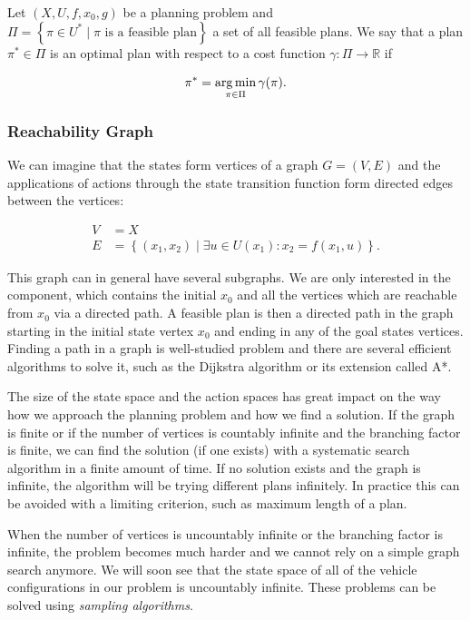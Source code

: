 \begin{defn}
	Let $\left(X, U, f, x_0, g\right)$ be a planning problem and $\Pi=\left\{\pi\in U^* \mid \pi \text{ is a feasible plan}\right\}$ a set of all feasible plans. We say that a plan $\pi^*\in \Pi$ is an optimal plan with respect to a cost function $\gamma: \Pi \rightarrow \mathbb{R}$ if
	
	\[
		\pi^*=\operatorname*{arg\,min}_{\pi\in\Pi} \gamma(\pi).
	\]
\end{defn}

\subsubsection{Reachability Graph}

We can imagine that the states form vertices of a graph $G=(V, E)$ and the applications of actions through the state transition function form directed edges between the vertices:

\begin{equation*}
\begin{aligned}
	V&=X \\
	E&=\left\{(x_1, x_2) \mid \exists u \in U(x_1): x_2 = f(x_1, u) \right\}.
\end{aligned}
\end{equation*}

This graph can in general have several subgraphs. We are only interested in the component, which contains the initial $x_0$ and all the vertices which are reachable from $x_0$ via a directed path. A feasible plan is then a directed path in the graph starting in the initial state vertex $x_0$ and ending in any of the goal states vertices. Finding a path in a graph is well-studied problem and there are several efficient algorithms to solve it, such as the Dijkstra algorithm or its extension called A*.

The size of the state space and the action spaces has great impact on the way how we approach the planning problem and how we find a solution. If the graph is finite or if the number of vertices is countably infinite and the branching factor is finite, we can find the solution (if one exists) with a systematic search algorithm in a finite amount of time. If no solution exists and the graph is infinite, the algorithm will be trying different plans infinitely. In practice this can be avoided with a limiting criterion, such as maximum length of a plan.

When the number of vertices is uncountably infinite or the branching factor is infinite, the problem becomes much harder and we cannot rely on a simple graph search anymore. We will soon see that the state space of all of the vehicle configurations in our problem is uncountably infinite. These problems can be solved using \textit{sampling algorithms}.

